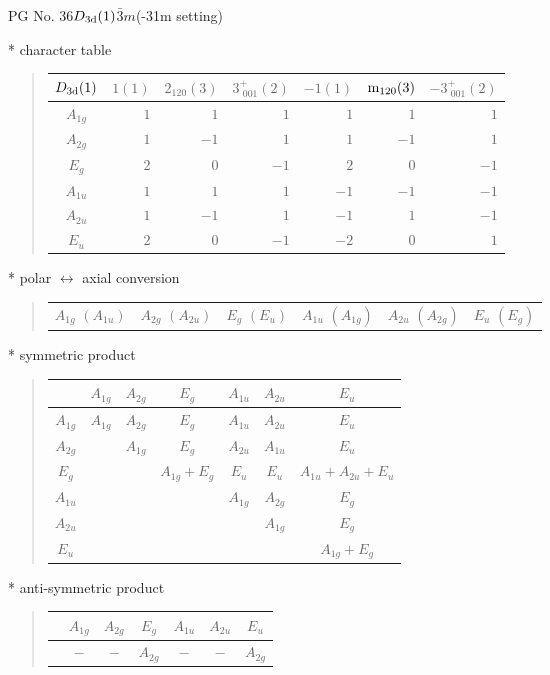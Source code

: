 \documentclass[fleqn,8pt,landscape]{jsarticle}
\begin{document}
\setcounter{MaxMatrixCols}{32}

\renewcommand{\tablename}{Table~}
\renewcommand{\figurename}{Figure~}
\begin{center}
\LARGE
PG No. 36\quad$D_{\rm 3d}(1)$\quad$\bar{3}m$\quad(-31m setting)\quad[ trigonal ]
\end{center}

* character table
\begin{quote}
\begin{tabular}{crrrrrr} \hline \hline
$ D_{\rm 3d}(1) $ & $ 1(1) $ & $ 2{}_{120}(3) $ & $ 3^{+}_{\,\,001}(2) $ & $ -1(1) $ & $ {\rm m}_{120}(3) $ & $ -3^{+}_{\,\,001}(2) $ \\ \hline
$ A_{1g} $ & $ 1 $ & $ 1 $ & $ 1 $ & $ 1 $ & $ 1 $ & $ 1 $ \\
$ A_{2g} $ & $ 1 $ & $ -1 $ & $ 1 $ & $ 1 $ & $ -1 $ & $ 1 $ \\
$ E_{g} $ & $ 2 $ & $ 0 $ & $ -1 $ & $ 2 $ & $ 0 $ & $ -1 $ \\
$ A_{1u} $ & $ 1 $ & $ 1 $ & $ 1 $ & $ -1 $ & $ -1 $ & $ -1 $ \\
$ A_{2u} $ & $ 1 $ & $ -1 $ & $ 1 $ & $ -1 $ & $ 1 $ & $ -1 $ \\
$ E_{u} $ & $ 2 $ & $ 0 $ & $ -1 $ & $ -2 $ & $ 0 $ & $ 1 $ \\
 \hline \hline
\end{tabular}
\end{quote}

* polar $\leftrightarrow$ axial conversion
\begin{quote}
\begin{tabular}{cccccc}
$ A_{1g}\,\,(A_{1u}) $ & $ A_{2g}\,\,(A_{2u}) $ & $ E_{g}\,\,(E_{u}) $ & $ A_{1u}\,\,(A_{1g}) $ & $ A_{2u}\,\,(A_{2g}) $ & $ E_{u}\,\,(E_{g}) $
\end{tabular}
\end{quote}

* symmetric product
\begin{quote}
\begin{tabular}{c|cccccc} \hline \hline
 & $ A_{1g} $ & $ A_{2g} $ & $ E_{g} $ & $ A_{1u} $ & $ A_{2u} $ & $ E_{u} $ \\ \hline
$ A_{1g} $ & $ A_{1g} $ & $ A_{2g} $ & $ E_{g} $ & $ A_{1u} $ & $ A_{2u} $ & $ E_{u} $ \\
$ A_{2g} $ & $  $ & $ A_{1g} $ & $ E_{g} $ & $ A_{2u} $ & $ A_{1u} $ & $ E_{u} $ \\
$ E_{g} $ & $  $ & $  $ & $ A_{1g} + E_{g} $ & $ E_{u} $ & $ E_{u} $ & $ A_{1u} + A_{2u} + E_{u} $ \\
$ A_{1u} $ & $  $ & $  $ & $  $ & $ A_{1g} $ & $ A_{2g} $ & $ E_{g} $ \\
$ A_{2u} $ & $  $ & $  $ & $  $ & $  $ & $ A_{1g} $ & $ E_{g} $ \\
$ E_{u} $ & $  $ & $  $ & $  $ & $  $ & $  $ & $ A_{1g} + E_{g} $ \\
 \hline \hline
\end{tabular}
\end{quote}

* anti-symmetric product
\begin{quote}
\begin{tabular}{ccccccc} \hline \hline
 & $ A_{1g} $ & $ A_{2g} $ & $ E_{g} $ & $ A_{1u} $ & $ A_{2u} $ & $ E_{u} $ \\ \hline
$  $ & $ - $ & $ - $ & $ A_{2g} $ & $ - $ & $ - $ & $ A_{2g} $ \\
 \hline \hline
\end{tabular}
\end{quote}
\end{document}
